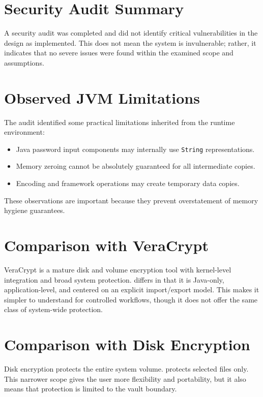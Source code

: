\section{Security Audit Summary}
A security audit was completed and did not identify critical vulnerabilities in the design as implemented. This does not mean the system is invulnerable; rather, it indicates that no severe issues were found within the examined scope and assumptions.

\section{Observed JVM Limitations}
The audit identified some practical limitations inherited from the runtime environment:
\begin{itemize}
  \item Java password input components may internally use \texttt{String} representations.
  \item Memory zeroing cannot be absolutely guaranteed for all intermediate copies.
  \item Encoding and framework operations may create temporary data copies.
\end{itemize}
These observations are important because they prevent overstatement of memory hygiene guarantees.

\section{Comparison with VeraCrypt}
VeraCrypt  \cite{veracrypt} is a mature disk and volume encryption tool with kernel-level integration and broad system protection. \projname{} differs in that it is Java-only, application-level, and centered on an explicit import/export model. This makes it simpler to understand for controlled workflows, though it does not offer the same class of system-wide protection.

\section{Comparison with Disk Encryption}
Disk encryption protects the entire system volume. \projname{} protects selected files only. This narrower scope gives the user more flexibility and portability, but it also means that protection is limited to the vault boundary.

